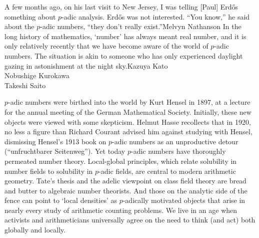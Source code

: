 %
%
%

\preface

%
%
%
%
%
%


\doubleepigraph 
{A few months ago, on his last visit to New Jersey, I was telling [Paul] Erd\H{o}s something about $p$-adic analysis. Erd\H{o}s was not interested. ``You know,'' he said about the $p$-adic numbers, ``they don’t really exist.''}{Melvyn Nathanson}
    {In the long history of mathematics, `number' has always meant real number, and it is only relatively recently that we have become aware of the world of $p$-adic numbers. The situation is akin to someone who has only experienced daylight gazing in astonishment at the night sky.}{Kazuya Kato\\ Nobushige Kurokawa\\ Takeshi Saito
    }

$p$-adic numbers were birthed into the world by Kurt Hensel in 1897, at a lecture for the annual meeting of the 
German Mathematical Society. Initially, these new objects were viewed with some skepticism. Helmut Hasse recollects that in 1920, no less a figure than Richard Courant advised him against studying with Hensel, dismissing Hensel's 1913 book on $p$-adic numbers as an unproductive detour (``unfruchtbarer Seitenweg''). Yet today $p$-adic numbers have thoroughly permeated number theory. Local-global principles, which relate solubility in number fields to solubility in $p$-adic fields, are central to modern arithmetic geometry.
Tate's thesis and the adelic viewpoint on class field theory are bread and butter to algebraic number theorists. And those on the analytic side of the fence can point to `local densities' as $p$-adically motivated objects that arise in nearly every study of arithmetic counting problems. We live in an age when activists and arithmeticians universally agree on the need to think (and act) both globally and locally. 

